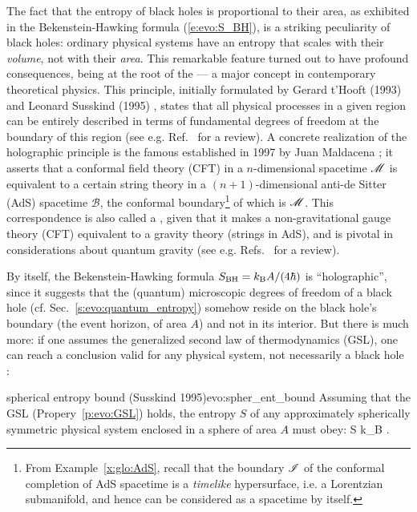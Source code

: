 The fact that the entropy of black holes is proportional to their area, as exhibited in the
Bekenstein-Hawking formula (\ref{e:evo:S_BH}), is a striking peculiarity
of black holes: ordinary physical systems have an entropy that scales with
their \emph{volume}, not with their \emph{area}. This remarkable feature turned out to have profound
consequences, being at the root of the  --- a major concept in contemporary theoretical physics.
This principle, initially formulated by Gerard t'Hooft (1993) \cite{tHoof94}
and Leonard Susskind (1995) \cite{Sussk95}, states that all physical processes in a given region
can be entirely described in terms of fundamental degrees of freedom at the boundary
of this region (see e.g. Ref.~\cite{Bouss02} for a review).
A concrete realization of the holographic principle is the famous  established in 1997 by Juan Maldacena \cite{Malda98};
it asserts that a conformal field theory (CFT) in a $n$-dimensional spacetime $\mathscr{M}$
is equivalent to a certain string theory in a $(n+1)$-dimensional anti-de Sitter (AdS) spacetime $\mathscr{B}$, the conformal boundary\footnote{From Example~\ref{x:glo:AdS},
recall that the boundary $\mathscr{I}$ of the conformal completion of AdS spacetime is a \emph{timelike} hypersurface, i.e. a Lorentzian submanifold, and hence can be considered as a spacetime by itself.}
of which is $\mathscr{M}$.
This correspondence is also called a , given
that it makes a non-gravitational gauge theory (CFT) equivalent to a gravity theory (strings in AdS),
and is pivotal in considerations about quantum gravity
(see e.g. Refs.~\cite{Natsu15,CasalLMRW14} for a review).

By itself, the Bekenstein-Hawking formula $S_{\rm BH} = k_{\rm B}{A}/(4\hbar)$
is ``holographic'', since it
suggests that the (quantum) microscopic degrees of
freedom of a black hole (cf. Sec.~\ref{s:evo:quantum_entropy}) somehow reside on the black hole's boundary (the event horizon, of area $A$) and not in
its interior. But there is much more: if one assumes the generalized second law of thermodynamics
(GSL), one can reach a conclusion valid
for any physical system, not necessarily a black hole \cite{Sussk95}:

\begin{tprop}{spherical entropy bound
\textnormal{(Susskind 1995)}}{evo:spher_ent_bound}
Assuming that the GSL (Propery~\ref{p:evo:GSL}) holds, the entropy $S$ of any
approximately spherically symmetric physical system enclosed in a sphere of area $A$
must obey:
\be \label{e:evo:spher_ent_bound}
    S \leq k_{\rm B} .
\ee
\end{tprop}

